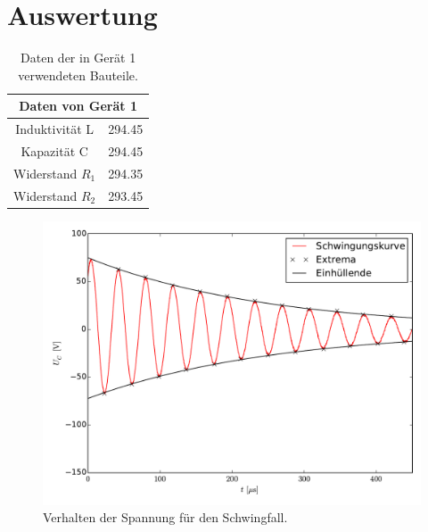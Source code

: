 \newpage
\section{Auswertung}
\label{sec:Auswertung}
\begin{table}
	\centering
	\begin{tabular}{c c}
	\toprule
	\multicolumn{2}{c}{Daten von Gerät 1} \\
	\midrule
 Induktivität L & 294.45 \\
 Kapazität C    & 294.45 \\
 Widerstand $R_1$ & 294.35 \\
 Widerstand $R_2$ & 293.45 \\
	\bottomrule
	\end{tabular}
	\caption{Daten der in Gerät 1 verwendeten Bauteile.}
	\label{tab:geraet}
\end{table}
\begin{figure}[h]
		\centering
		\includegraphics[width=\textwidth]{build/plot_schwingungskurve.pdf}
		\caption{Verhalten der Spannung für den Schwingfall.}
\end{figure}

